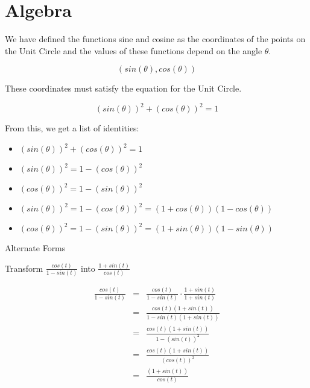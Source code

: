 \documentclass{ximera}
\begin{document}
\section{Algebra}

We have defined the functions sine and cosine as the coordinates of the points on the Unit Circle and the values of these functions depend on the angle $\theta$.

\[    ( sin(\theta), cos(\theta) ) \]


These coordinates must satisfy the equation for the Unit Circle. 



\[    ( sin(\theta) )^2 + ( cos(\theta) )^2 = 1 \]



From this, we get a list of identities:



\begin{observation}


\begin{itemize}
\item $( sin(\theta) )^2 + ( cos(\theta) )^2 = 1$
\item $( sin(\theta) )^2 =  1 - ( cos(\theta) )^2$
\item $( cos(\theta) )^2 =  1 - ( sin(\theta) )^2$
\item $( sin(\theta) )^2 =  1 - ( cos(\theta) )^2 = (1 + cos(\theta))(1 - cos(\theta))$
\item $( cos(\theta) )^2 =  1 - ( sin(\theta) )^2 = (1 + sin(\theta))(1 - sin(\theta))$
\end{itemize}


\end{observation}













\begin{example} Alternate Forms


Transform $\frac{cos(t)}{1 - sin(t)}$ into $\frac{1 + sin(t)}{cos(t)}$



\begin{explanation}

\begin{align*}
\frac{cos(t)}{1 - sin(t)}  &  = &  \frac{cos(t)}{1 - sin(t)}  \cdot \frac{1 + sin(t)}{1 + sin(t)}  \\
                           &  = &  \frac{cos(t)(1 + sin(t))}{1 - sin(t)(1 + sin(t))}  \\
                           &  = &  \frac{cos(t)(1 + sin(t))}{1 - (sin(t))^2}  \\
                           &  = &  \frac{cos(t)(1 + sin(t))}{(cos(t))^2}  \\
                           &  = &  \frac{(1 + sin(t))}{cos(t)}  
\end{align*}



\end{explanation}




\end{example}
\end{document}
